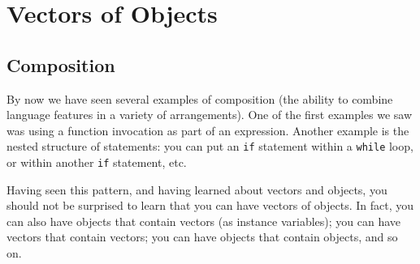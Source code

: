 





\chapter{Vectors of Objects}

\section{Composition}

By now we have seen several examples of composition (the ability to
combine language features in a variety of arrangements).  One of the
first examples we saw was using a function invocation as part of an
expression.  Another example is the nested structure of statements:
you can put an {\tt if} statement within a {\tt while} loop, or within
another {\tt if} statement, etc.

Having seen this pattern, and having learned about vectors and objects,
you should not be surprised to learn that you can have vectors of
objects.  In fact, you can also have objects that contain vectors (as
instance variables); you can have vectors that contain vectors; you can
have objects that contain objects, and so on.

